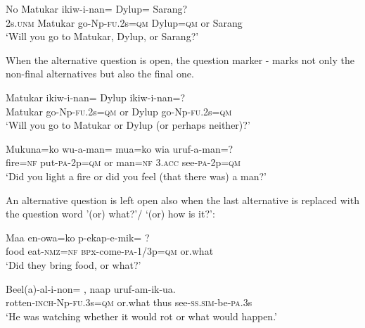 \ea%
\label{ex:7:x1184}
\gll No  Matukar  ikiw-i-nan=  Dylup=    Sarang? \\
2s.\textsc{unm}  Matukar  go-Np-\textsc{fu}.2s=\textsc{qm}  Dylup=\textsc{qm}  or  Sarang      \\
\glt `Will you go to Matukar, Dylup, or Sarang?'
\z


When the alternative question is open, the question marker -  marks not only the non-final alternatives but also the final one. 

\ea%
\label{ex:7:x1185}
\gll Matukar  ikiw-i-nan=    Dylup  ikiw-i-nan=? \\
Matukar  go-Np-\textsc{fu}.2s=\textsc{qm}  or  Dylup  go-Np-\textsc{fu}.2s=\textsc{qm}      \\
\glt `Will you go to Matukar or Dylup (or perhaps neither)?'
\z





\ea%
\label{ex:7:x1186}
\gll Mukuna=ko  wu-a-man=    mua=ko  wia  uruf-a-man=? \\
fire=\textsc{nf}  put-\textsc{pa}-2p=\textsc{qm}  or  man=\textsc{nf}  3.\textsc{acc}  see-\textsc{pa}-2p=\textsc{qm}      \\
\glt `Did you light a fire or did you feel (that there was) a man?'
\z





An alternative question is left open also when the last alternative is replaced with the question word  '(or) what?'/ `(or) how is it?':

\ea%
\label{ex:7:x1350}
\gll Maa  en-owa=ko  p-ekap-e-mik=  ? \\
food  eat-\textsc{nmz}=\textsc{nf}  \textsc{bp}x-come-\textsc{pa}-1/3p=\textsc{qm}  or.what      \\
\glt `Did they bring food, or what?'
\z





\ea%
\label{ex:7:x1351}
\gll Beel(a)-al-i-non=  ,  naap  uruf-am-ik-ua. \\
rotten-\textsc{inch}-Np-\textsc{fu}.3s=\textsc{qm}  or.what  thus  see-\textsc{ss}.\textsc{sim}-be-\textsc{pa}.3s      \\
\glt `He was watching whether it would rot or what would happen.'
\z





